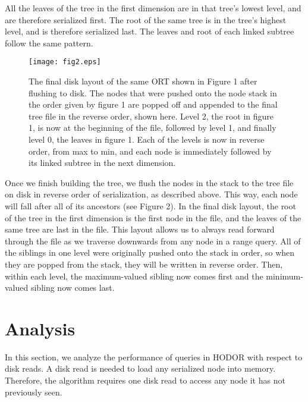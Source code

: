 \documentclass[11pt, oneside]{article}
\begin{document}
All the leaves of the tree in the first dimension are in that tree's lowest
level, and are therefore serialized first. The root of the same tree is in the
tree's highest level, and is therefore serialized last. The leaves and root of
each linked subtree follow the same pattern. 

\begin{figure}[h!]
    \centering
    \vspace{0.25in}
    \texttt{[image: fig2.eps]}
    \caption{
        The final disk layout of the same ORT shown in Figure 1 after flushing
        to disk. The nodes that were pushed onto the node stack in the order
        given by figure 1 are popped off and appended to the final tree file in
        the reverse order, shown here. Level 2, the root in figure 1, is now at
        the beginning of the file, followed by level 1, and finally level 0,
        the leaves in figure 1. Each of the levels is now in reverse order,
        from max to min, and each node is immediately followed by its linked
        subtree in the next dimension. 
    }
    \vspace{0.25in}
\end{figure}

Once we finish building the tree, we flush the nodes in the stack to the tree
file on disk in reverse order of serialization, as described above. This way,
each node will fall after all of its ancestors (see Figure 2). In the final disk
layout, the root of the tree in the first dimension is the first node in the
file, and the leaves of the same tree are last in the file. This layout allows
us to always read forward through the file as we traverse downwards from any
node in a range query. All of the siblings in one level were originally pushed
onto the stack in order, so when they are popped from the stack, they will be
written in reverse order. Then, within each level, the maximum-valued sibling
now comes first and the minimum-valued sibling now comes last. 

\section{Analysis}

In this section, we analyze the performance of queries in HODOR with respect to
disk reads. A disk read is needed to load any serialized node into memory.
Therefore, the algorithm requires one disk read to access any node it has not
previously seen.
\end{document}
